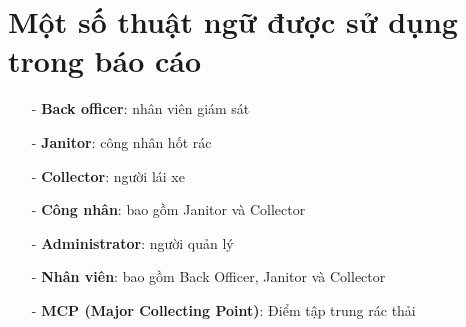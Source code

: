 \section{Một số thuật ngữ được sử dụng trong báo cáo}
    \begin{itemize}
        \item[-] \textbf{Back officer}: nhân viên giám sát
        \item[-] \textbf{Janitor}: công nhân hốt rác
        \item[-] \textbf{Collector}: người lái xe
        \item[-] \textbf{Công nhân}: bao gồm Janitor và Collector
        \item[-] \textbf{Administrator}: người quản lý
        \item[-] \textbf{Nhân viên}: bao gồm Back Officer, Janitor và Collector
        \item[-] \textbf{MCP (Major Collecting Point)}: Điểm tập trung rác thải
    \end{itemize}


